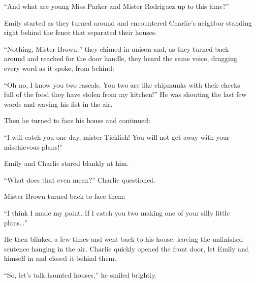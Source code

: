 “And what are young Miss Parker and Mister Rodriguez up to this time?”

Emily started as they turned around and encountered Charlie's neighbor standing right behind the fence that separated their houses.

“Nothing, Mister Brown,” they chimed in unison and, as they turned back around and reached for the door handle, they heard the same voice, dragging every word as it spoke, from behind:

“Oh no, I know you two rascals. You two are like chipmunks with their cheeks full of the food they have stolen from my kitchen!” He was shouting the last few words and waving his fist in the air.

Then he turned to face his house and continued:

“I will catch you one day, mister Ticklish! You will not get away with your mischievous plans!”

Emily and Charlie stared blankly at him.

“What does that even mean?” Charlie questioned.

Mister Brown turned back to face them:

“I think I made my point. If I catch you two making one of your silly little plans…”

He then blinked a few times and went back to his house, leaving the unfinished sentence hanging in the air. Charlie quickly opened the front door, let Emily and himself in and closed it behind them.

“So, let's talk haunted houses,” he smiled brightly.